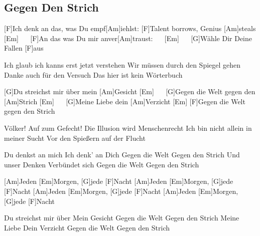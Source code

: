 \subsection*{Gegen Den Strich   }



\begin{guitar}


[F]Ich denk an das, was Du empf[Am]iehlst:
[F]Talent borrows, Genius [Am]steals [Em] $\quad$
[F]An das was Du mir anver[Am]traust: $\quad$ [Em] $\quad$
[G]Wähle Dir Deine Fallen [F]aus


Ich glaub ich kanns erst jetzt verstehen
Wir müssen durch den Spiegel gehen
Danke auch für den Versuch
Das hier ist kein Wörterbuch


[G]Du streichst mir über mein [Am]Gesicht [Em] $\quad$
[G]Gegen die Welt gegen den [Am]Strich [Em] $\quad$
[G]Meine Liebe dein [Am]Verzicht [Em]
[F]Gegen die Welt gegen den Strich


Völker! Auf zum Gefecht!
Die Illusion wird Menschenrecht
Ich bin nicht allein in meiner Sucht
Vor den Spießern auf der Flucht


Du denkst an mich
Ich denk' an Dich
Gegen die Welt
Gegen den Strich
Und unser Denken
Verbündet sich
Gegen die Welt
Gegen den Strich

[Am]Jeden [Em]Morgen, [G]jede [F]Nacht
[Am]Jeden [Em]Morgen, [G]jede [F]Nacht
[Am]Jeden [Em]Morgen, [G]jede [F]Nacht
[Am]Jeden [Em]Morgen, [G]jede [F]Nacht


Du streichst mir über
Mein Gesicht
Gegen die Welt
Gegen den Strich
Meine Liebe
Dein Verzicht
Gegen die Welt
Gegen den Strich
\end{guitar}
